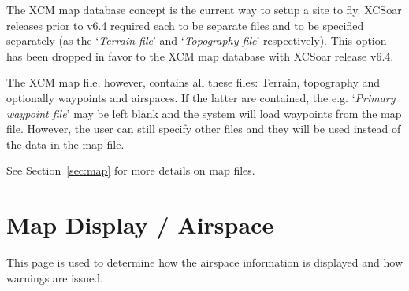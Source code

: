 The XCM map database concept is the current way to setup a site to fly.
XCSoar releases prior to v6.4 required each to be separate files and to be
specified separately (as the `{\it Terrain file}' and `{\it Topography file}' respectively). This 
option has been dropped in favor to the XCM map database with XCSoar release v6.4.  

The XCM map file, however, contains all these files: Terrain, topography
and optionally waypoints and airspaces.  If the latter are contained, the e.g. `{\it Primary waypoint file}' 
may be left blank and the system will load waypoints from the map file. 
However, the user can still specify other files and they will be used instead of 
the data in the map file.

See Section~\ref{sec:map} for more details on map files.


\section{Map Display / Airspace}\label{sec:map-airspace}

This page is used to determine how the airspace information is
displayed and how warnings are issued.

